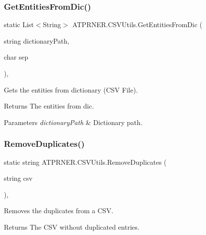 \subsubsection{\texorpdfstring{Get\+Entities\+From\+Dic()}{GetEntitiesFromDic()}}
{\footnotesize\ttfamily static List$<$String$>$ A\+T\+P\+R\+N\+E\+R.\+C\+S\+V\+Utils.\+Get\+Entities\+From\+Dic (\begin{DoxyParamCaption}\item[{string}]{dictionary\+Path,  }\item[{char}]{sep }\end{DoxyParamCaption})\hspace{0.3cm}{\ttfamily [inline]}, {\ttfamily [static]}}



Gets the entities from dictionary (C\+SV File). 

\begin{DoxyReturn}{Returns}
The entities from dic.
\end{DoxyReturn}

\begin{DoxyParams}{Parameters}
{\em dictionary\+Path} & Dictionary path.\\
\hline
\end{DoxyParams}
\hypertarget{class_a_t_p_r_n_e_r_1_1_c_s_v_utils_ab236c362e83053e0e7165aa2e45849c4}{}\label{class_a_t_p_r_n_e_r_1_1_c_s_v_utils_ab236c362e83053e0e7165aa2e45849c4} 
\subsubsection{\texorpdfstring{Remove\+Duplicates()}{RemoveDuplicates()}}
{\footnotesize\ttfamily static string A\+T\+P\+R\+N\+E\+R.\+C\+S\+V\+Utils.\+Remove\+Duplicates (\begin{DoxyParamCaption}\item[{string}]{csv }\end{DoxyParamCaption})\hspace{0.3cm}{\ttfamily [inline]}, {\ttfamily [static]}}



Removes the duplicates from a C\+SV. 

\begin{DoxyReturn}{Returns}
The C\+SV without duplicated entries.
\end{DoxyReturn}

